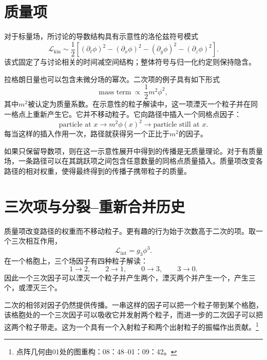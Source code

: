 \section{质量项}

对于标量场，所讨论的导数结构具有示意性的洛伦兹符号模式
\begin{equation}
\mathcal{L}_{\mathrm{kin}}
\sim
\frac{1}{2}\left[
(\partial_t\phi)^2
-(\partial_x\phi)^2
-(\partial_y\phi)^2
-(\partial_z\phi)^2
\right].
\end{equation}
该式固定了与讨论相关的时间减空间结构；整体符号与归一化约定则保持隐含。

拉格朗日量也可以包含未微分场的幂次。二次项的例子具有如下形式
\begin{equation}
\text{mass term}\ \propto\ \frac{1}{2}m^2\phi^2,
\end{equation}
其中\(m^2\)被认定为质量系数。在示意性的粒子解读中，这一项湮灭一个粒子并在同一格点上重新产生它。它并不移动粒子。它向路径中插入一个同格点因子：
\begin{equation}
\text{particle at }x
\longrightarrow
\boxed{m^2\phi(x)^2}
\longrightarrow
\text{particle still at }x.
\end{equation}
每当这样的插入作用一次，路径就获得另一个正比于\(m^2\)的因子。

如果只保留导数项，则在这一示意性展开中得到的传播是无质量理论。对于有质量场，一条路径可以在其跳跃项之间包含任意数量的同格点质量插入。质量项改变各路径的相对权重，使得最终得到的传播子携带粒子的质量。

\section{三次项与分裂--重新合并历史}

质量项改变路径的权重而不移动粒子。更有趣的行为始于次数高于二次的项。取一个三次相互作用，
\begin{equation}
\mathcal{L}_{\mathrm{int}}=g_3\phi^3.
\end{equation}
在一个格胞上，三个场因子有四种粒子解读：
\begin{equation}
1\longrightarrow 2,
\qquad
2\longrightarrow 1,
\qquad
0\longrightarrow 3,
\qquad
3\longrightarrow 0.
\end{equation}
因此一个三次因子可以湮灭一个粒子并产生两个，湮灭两个并产生一个，产生三个，或湮灭三个。

二次的相邻对因子仍然提供传播。一串这样的因子可以把一个粒子带到某个格胞，该格胞处的一个三次因子可以吸收它并发射两个粒子，而进一步的二次因子可以把这两个粒子带走。这为一个具有一个入射粒子和两个出射粒子的振幅作出贡献。\footnote{点阵几何由01处的图重构：08：48--01：09：42。}

